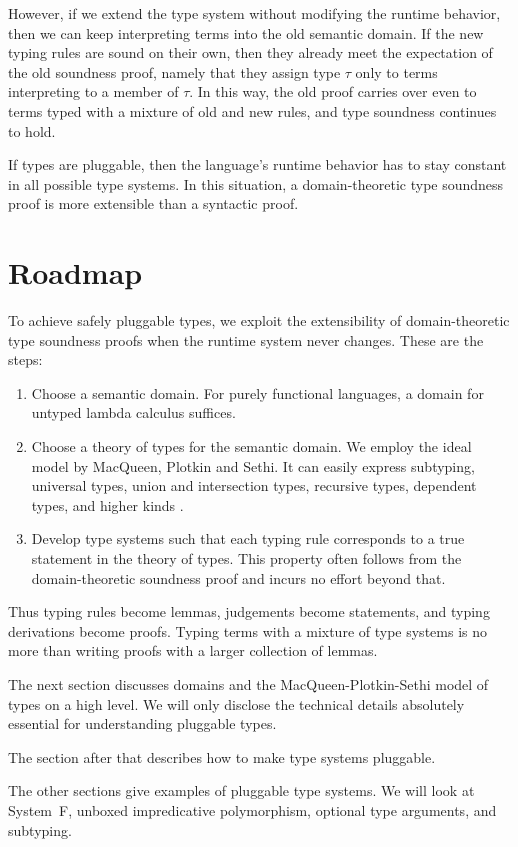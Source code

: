 \documentclass{amsart}
\def\thingsExpressibleInMpsModel{%
subtyping, universal types, union and intersection types,
recursive types, dependent types, and higher kinds%
}
\begin{document}
However, if we extend the type system without modifying the
runtime behavior, then we can keep interpreting terms into the
old semantic domain. If the new typing rules are sound on their
own, then they already meet the expectation of the old soundness
proof, namely that they assign type $\tau$ only to terms
interpreting to a member of $\tau$. In this way, the old proof
carries over even to terms typed with a mixture of old and new
rules, and type soundness continues to hold.

If types are pluggable, then the language's runtime behavior has
to stay constant in all possible type systems. In this situation,
a domain-theoretic type soundness proof is more extensible than a
syntactic proof.


\section{Roadmap}

To achieve safely pluggable types, we exploit the extensibility
of domain-theoretic type soundness proofs when the runtime system
never changes. These are the steps:
\begin{enumerate}
\item Choose a semantic domain. For purely functional languages,
a domain for untyped lambda calculus suffices.
\item Choose a theory of types for the semantic domain. We employ
the ideal model by MacQueen, Plotkin and Sethi. It can easily
express \thingsExpressibleInMpsModel.
\item Develop type systems such that each typing rule corresponds
to a true statement in the theory of types. This property often
follows from the domain-theoretic soundness proof and incurs no
effort beyond that.
\end{enumerate}
Thus typing rules become lemmas, judgements become statements,
and typing derivations become proofs. Typing terms with a mixture
of type systems is no more than writing proofs with a larger
collection of lemmas.

The next section discusses domains and the MacQueen-Plotkin-Sethi
model of types on a high level. We will only disclose the
technical details absolutely essential for understanding
pluggable types.

The section after that describes how to make type systems
pluggable.

The other sections give examples of pluggable type systems. We
will look at System~F, unboxed impredicative polymorphism,
optional type arguments, and subtyping.
\end{document}

